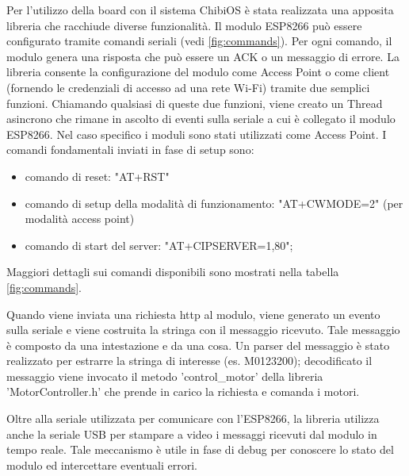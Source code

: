 \documentclass [11pt ,a4paper ,twoside ]{article}
\begin{document}
 Per l'utilizzo della board con il sistema ChibiOS \`e stata realizzata una apposita libreria che racchiude diverse funzionalit\`a. Il modulo ESP8266 pu\`o essere configurato tramite comandi seriali (vedi \ref{fig:commands}). Per ogni comando, il modulo genera una risposta che pu\`o essere un ACK o un messaggio di errore.
La libreria consente la configurazione del modulo come Access Point o come client (fornendo le credenziali di accesso ad una rete Wi-Fi) tramite due semplici funzioni. Chiamando qualsiasi di queste due funzioni, viene creato un Thread asincrono che rimane in ascolto di eventi sulla seriale a cui \`e collegato il modulo ESP8266. Nel caso specifico i moduli sono stati utilizzati come Access Point.
I comandi fondamentali inviati in fase di setup sono:
\begin{itemize}
	\item comando di reset: "AT+RST"
	\item comando di setup della modalit\`a di funzionamento: "AT+CWMODE=2" (per modalit\`a access point)
	\item comando di start del server:  "AT+CIPSERVER=1,80";
\end{itemize}
Maggiori dettagli sui comandi disponibili sono mostrati nella tabella \ref{fig:commands}.
\par Quando viene inviata una richiesta http al modulo, viene generato un evento sulla seriale e viene costruita la stringa con il messaggio ricevuto. Tale messaggio \`e composto da una intestazione e da una cosa. Un parser del messaggio \`e stato realizzato per estrarre la stringa di interesse (es. M0123200); decodificato il messaggio viene invocato il metodo 'control\_motor' della libreria 'MotorController.h' che prende in carico la richiesta e comanda i motori.
\par Oltre alla seriale utilizzata per comunicare con l'ESP8266, la libreria utilizza anche la seriale USB per stampare a video i messaggi ricevuti dal modulo in tempo reale. Tale meccanismo \`e utile in fase di debug per conoscere lo stato del modulo ed intercettare eventuali errori. 
\end{document}
